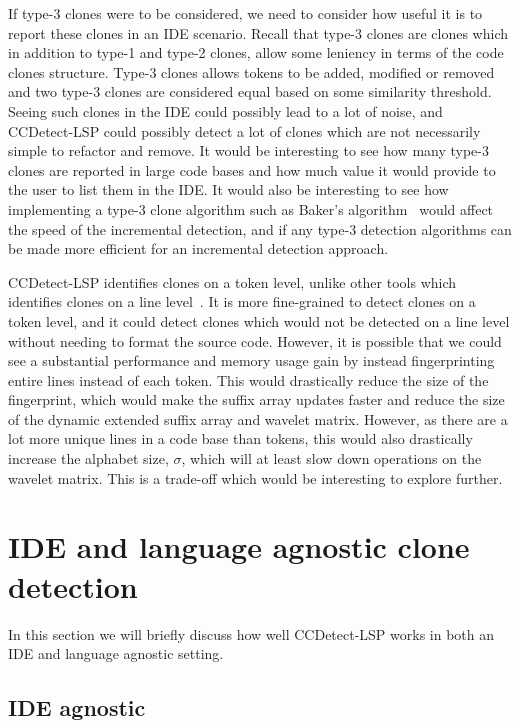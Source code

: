 If type-3 clones were to be considered, we need to consider how useful it is to report
these clones in an IDE scenario. Recall that type-3 clones are clones which in addition to
type-1 and type-2 clones, allow some leniency in terms of the code clones structure.
Type-3 clones allows tokens to be added, modified or removed and two type-3 clones are
considered equal based on some similarity threshold. Seeing such clones in the IDE could
possibly lead to a lot of noise, and CCDetect-LSP could possibly detect a lot of clones
which are not necessarily simple to refactor and remove. It would be interesting to see
how many type-3 clones are reported in large code bases and how much value it would
provide to the user to list them in the IDE. It would also be interesting to see how
implementing a type-3 clone algorithm such as Baker's
algorithm~\cite{BakerSparseDynamicProgramming} would affect the speed of the incremental
detection, and if any type-3 detection algorithms can be made more efficient for an
incremental detection approach.

CCDetect-LSP identifies clones on a token level, unlike other tools which identifies
clones on a line level~\cite{Zibran_real_time_search}. It is more fine-grained to detect
clones on a token level, and it could detect clones which would not be detected on a line
level without needing to format the source code. However, it is possible that we could see
a substantial performance and memory usage gain by instead fingerprinting entire lines
instead of each token. This would drastically reduce the size of the fingerprint, which
would make the suffix array updates faster and reduce the size of the dynamic extended
suffix array and wavelet matrix. However, as there are a lot more unique lines in a code
base than tokens, this would also drastically increase the alphabet size, $\sigma$, which
will at least slow down operations on the wavelet matrix. This is a trade-off which would
be interesting to explore further.

\section{IDE and language agnostic clone detection}

In this section we will briefly discuss how well CCDetect-LSP works in both an IDE and
language agnostic setting.

\subsection*{IDE agnostic}

